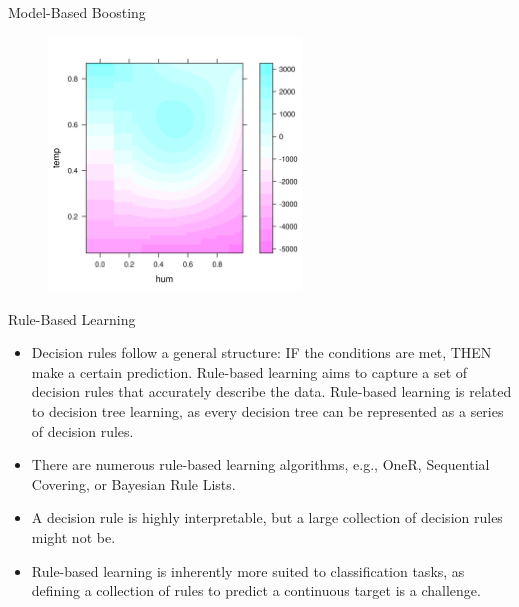 \documentclass[11pt,compress,t,notes=noshow, xcolor=table]{beamer}
\begin{document}
\begin{vbframe}{Model-Based Boosting}
\begin{figure}
  \includegraphics[width = 0.6\textwidth]{figure/mboost_effect_plot.png}
\end{figure}
\end{vbframe}


\begin{vbframe}{Rule-Based Learning}

\begin{itemize}
\setlength\itemsep{2em}
\item 
Decision rules follow a general structure: IF the conditions are met, THEN make a certain prediction. Rule-based learning aims to capture a set of decision rules that accurately describe the data. Rule-based learning is related to decision tree learning, as every decision tree can be represented as a series of decision rules.
\item There are numerous rule-based learning algorithms, e.g., OneR, Sequential Covering, or Bayesian Rule Lists.
\item A decision rule is highly interpretable, but a large collection of decision rules might not be.
\item Rule-based learning is inherently more suited to classification tasks, as defining a collection of rules to predict a continuous target is a challenge.
\end{itemize}

\end{vbframe}


\endlecture
\end{document}
